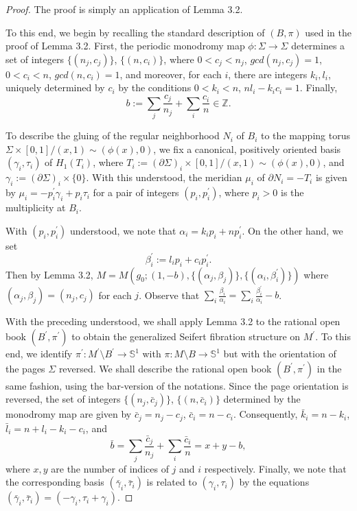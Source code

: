 \documentclass[10pt,a4paper]{amsart}
\newcommand{\Z}{{\mathbb Z}}
\newcommand{\s}{{\mathbb S}}
\begin{document}
\begin{proof}
The proof is simply an application of Lemma 3.2.

To this end, we begin by recalling the standard description of $(B,\pi)$ used in the proof of Lemma 3.2. First, the periodic monodromy map $\phi: \Sigma\rightarrow \Sigma$ determines a
set of integers $\{(n_j,c_j)\}$, $\{(n,c_i)\}$, where $0<c_j<n_j$, $gcd(n_j,c_j)=1$, 
$0<c_i<n$, $gcd(n,c_i)=1$, and moreover, for each $i$, there are integers $k_i,l_i$, uniquely determined by $c_i$ by the conditions $0<k_i<n$, $nl_i-k_ic_i=1$. Finally, 
$$b:=\sum_j\frac{c_j}{n_j}+\sum_i\frac{c_i}{n}\in\Z.$$

To describe the gluing of the regular neighborhood $N_i$ of $B_i$ to the mapping torus 
$\Sigma\times [0,1]/ (x,1)\sim (\phi(x),0)$, we fix a canonical, positively oriented basis 
$(\gamma_i,\tau_i)$ of $H_1(T_i)$, where $T_i:=(\partial \Sigma)_i \times [0,1]/ (x,1)\sim (\phi(x),0)$,
and $\gamma_i:=(\partial \Sigma)_i \times \{0\}$. With this understood, the meridian $\mu_i$ of
$\partial N_i=-T_i$ is given by $\mu_i=-p_i^\prime\gamma_i +p_i\tau_i$ for a pair of integers 
$(p_i,p_i^\prime)$, where $p_i>0$ is the multiplicity at $B_i$.

With $(p_i,p_i^\prime)$ understood, we note that $\alpha_i=k_ip_i+np_i^\prime$. On the other hand,
we set 
$$
\beta_i^\prime:=l_ip_i+c_ip_i^\prime.
$$
Then by Lemma 3.2, $M=M(g_0; (1,-b), \{(\alpha_j,\beta_j)\}, \{(\alpha_i,\beta_i^\prime)\})$
where $(\alpha_j,\beta_j)=(n_j,c_j)$ for each $j$.  Observe that $\sum_i\frac{\beta_i}{\alpha_i}=\sum_i\frac{\beta_i^\prime}{\alpha_i}-b$.

With the preceding understood, we shall apply Lemma 3.2 to the rational open book 
$(B^\prime,\pi^\prime)$ to obtain the generalized Seifert fibration structure on $M^\prime$. To this end,
we identify $\pi^\prime: M^\prime\setminus B^\prime \rightarrow \s^1$ with $\pi: M\setminus B \rightarrow \s^1$ but with the orientation of the pages $\Sigma$ reversed. We shall describe the rational open book $(B^\prime,\pi^\prime)$ in the same fashion, using the bar-version of the notations. Since the page orientation is reversed, the set of integers $\{(n_j, \bar{c}_j)\}$, $\{(n,\bar{c}_i)\}$ determined by the monodromy map are given by $\bar{c}_j=n_j-c_j$, $\bar{c}_i=n-c_i$. 
Consequently, $\bar{k}_i=n-k_i$, $\bar{l}_i=n+l_i-k_i-c_i$, and 
$$
\bar{b}=\sum_j\frac{\bar{c}_j}{n_j}+\sum_i\frac{\bar{c}_i}{n}=x+y-b,
$$
where $x,y$ are the number of indices of $j$ and $i$ respectively. Finally, we note that the corresponding basis $(\bar{\gamma}_i,\bar{\tau}_i)$ is related to $(\gamma_i,\tau_i)$ by the 
equations $(\bar{\gamma}_i,\bar{\tau}_i)=(-\gamma_i, \tau_i+\gamma_i)$. 


\end{proof}
\end{document}
